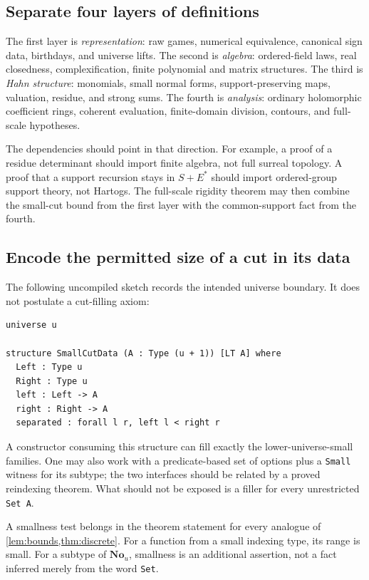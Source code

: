\documentclass[11pt,letterpaper]{article}
\numberwithin{equation}{section}
\theoremstyle{definition}
\theoremstyle{remark}
\newcommand{\No}{\mathbf{No}}
\begin{document}
\subsection{Separate four layers of definitions}
The first layer is \emph{representation}: raw games, numerical equivalence, canonical sign data, birthdays, and universe lifts. The second is \emph{algebra}: ordered-field laws, real closedness, complexification, finite polynomial and matrix structures. The third is \emph{Hahn structure}: monomials, small normal forms, support-preserving maps, valuation, residue, and strong sums. The fourth is \emph{analysis}: ordinary holomorphic coefficient rings, coherent evaluation, finite-domain division, contours, and full-scale hypotheses.

The dependencies should point in that direction. For example, a proof of a residue determinant should import finite algebra, not full surreal topology. A proof that a support recursion stays in $S+E^*$ should import ordered-group support theory, not Hartogs. The full-scale rigidity theorem may then combine the small-cut bound from the first layer with the common-support fact from the fourth.

\subsection{Encode the permitted size of a cut in its data}
The following uncompiled sketch records the intended universe boundary. It does not postulate a cut-filling axiom:
\begin{samepage}
\begin{lstlisting}
universe u

structure SmallCutData (A : Type (u + 1)) [LT A] where
  Left : Type u
  Right : Type u
  left : Left -> A
  right : Right -> A
  separated : forall l r, left l < right r
\end{lstlisting}
\end{samepage}
A constructor consuming this structure can fill exactly the lower-universe-small families. One may also work with a predicate-based set of options plus a \texttt{Small} witness for its subtype; the two interfaces should be related by a proved reindexing theorem. What should not be exposed is a filler for every unrestricted \texttt{Set A}.

A smallness test belongs in the theorem statement for every analogue of \cref{lem:bounds,thm:discrete}. For a function from a small indexing type, its range is small. For a subtype of $\No_u$, smallness is an additional assertion, not a fact inferred merely from the word \texttt{Set}.
\end{document}

